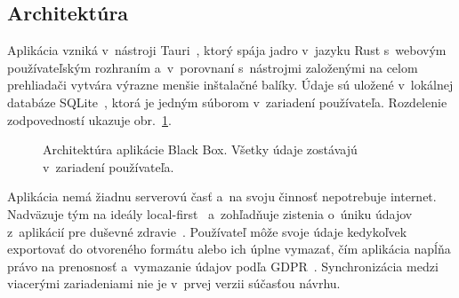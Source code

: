 \documentclass[10pt,twoside,slovak,a4paper]{article}
\begin{document}
\subsection{Architektúra}

Aplikácia vzniká v~nástroji Tauri~\cite{Tauri}, ktorý spája jadro
v~jazyku Rust s~webovým používateľským rozhraním a~v~porovnaní s~nástrojmi
založenými na celom prehliadači vytvára výrazne menšie inštalačné balíky.
Údaje sú uložené v~lokálnej databáze SQLite~\cite{SQLite}, ktorá je
jedným súborom v~zariadení používateľa. Rozdelenie zodpovedností ukazuje
obr.~\ref{f:architektura}.

\begin{figure}[tbh]
\centering
{}
\caption{Architektúra aplikácie Black Box. Všetky údaje zostávajú
v~zariadení používateľa.}
\label{f:architektura}
\end{figure}

Aplikácia nemá žiadnu serverovú časť a~na svoju činnosť nepotrebuje
internet. Nadväzuje tým na ideály local-first~\cite{Kleppmann:LocalFirst}
a~zohľadňuje zistenia o~úniku údajov z~aplikácií pre duševné
zdravie~\cite{Huckvale:Privacy}. Používateľ môže svoje údaje kedykoľvek
exportovať do otvoreného formátu alebo ich úplne vymazať, čím aplikácia
napĺňa právo na prenosnosť a~vymazanie údajov podľa
GDPR~\cite{GDPR}. Synchronizácia medzi viacerými zariadeniami nie je
v~prvej verzii súčasťou návrhu.
\end{document}
